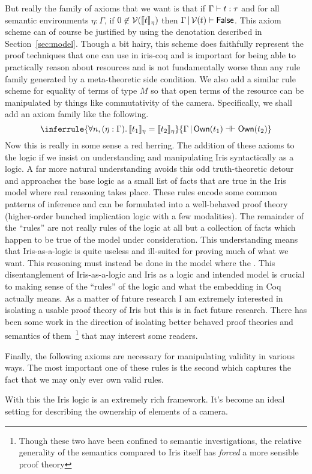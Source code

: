 \documentclass{amsart}
\newcommand{\provesJ}[3]{#1 \mathop{\vert} #2 \proves #3}
\newcommand{\provesIffJ}[3]{#1 \mathop{\vert} #2 \provesIff #3}
\begin{document}
But really the family of axioms that we want is that if
$\Gamma \vdash t : \tau$ and for all semantic environments
$\eta : \Gamma$, if $0 \not\in \mathcal{V}(\llbracket t \rrbracket_\eta)$ then
$\provesJ{\Gamma}{\mval(t)}{\FALSE}$. This axiom scheme can of course
be justified by using the denotation described in
Section~\ref{sec:model}. Though a bit hairy, this scheme does
faithfully represent the proof techniques that one can use in iris-coq
and is important for being able to practically reason about resources
and is not fundamentally worse than any rule family generated by a
meta-theoretic side condition. We also add a similar rule scheme for
equality of terms of type $M$ so that open terms of the resource can
be manipulated by things like commutativity of the
camera. Specifically, we shall add an axiom family like the
following.
\[
  \inferrule{
    \All n, (\eta : \Gamma). \Sem{t_1}_\eta = \Sem{t_2}_\eta
  }{\provesIffJ{\Gamma}{\ownM{t_1}}{\ownM{t_2}}}
\]
Now this is really in some sense a red herring. The addition of these
axioms to the logic if we insist on understanding and manipulating
Iris syntactically as a logic. A far more natural understanding avoids
this odd truth-theoretic detour and approaches the base logic as a
small list of facts that are true in the Iris model where real
reasoning takes place. These rules encode some common patterns of
inference and can be formulated into a well-behaved proof theory
(higher-order bunched implication logic with a few modalities). The
remainder of the ``rules'' are not really rules of the logic at all
but a collection of facts which happen to be true of the model under
consideration. This understanding means that Iris-as-a-logic is quite
useless and ill-suited for proving much of what we want. This
reasoning must instead be done in the model where the . This
disentanglement of Iris-as-a-logic and Iris as a logic and intended
model is crucial to making sense of the ``rules'' of the logic and
what the embedding in Coq actually means. As a matter of future
research I am extremely interested in isolating a usable proof theory
of Iris but this is in fact future research. There has been some work
in the direction of isolating better behaved proof theories and
semantics of them~\citep{Biering:07,Bizjak:17}\footnote{Though these
  two have been confined to semantic investigations, the relative
  generality of the semantics compared to Iris itself has
  \emph{forced} a more sensible proof theory} that may interest some
readers.

Finally, the following axioms are necessary for manipulating validity
in various ways. The most important one of these rules is the second
which captures the fact that we may only ever own valid rules.
With this the Iris logic is an extremely rich framework. It's become
an ideal setting for describing the ownership of elements of a
camera.
\end{document}
